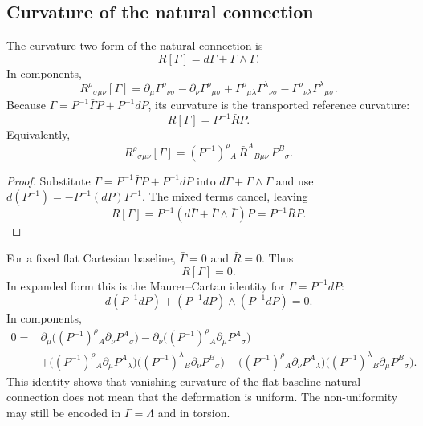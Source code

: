 \documentclass[12pt]{amsart}
\theoremstyle{definition}
\theoremstyle{remark}
\begin{document}
\subsection{Curvature of the natural connection}\label{subsec:curvature_natural_connection}

The curvature two-form of the natural connection is
\begin{equation}\label{eq:curvature_general_coefficients}
 R[\Gamma]=d\Gamma+\Gamma\wedge\Gamma.
\end{equation}
In components,
\begin{equation}\label{eq:curvature_components_gamma}
 R^\rho{}_{\sigma\mu\nu}[\Gamma]
 =\partial_\mu\Gamma^\rho{}_{\nu\sigma}
 -\partial_\nu\Gamma^\rho{}_{\mu\sigma}
 +\Gamma^\rho{}_{\mu\lambda}\Gamma^\lambda{}_{\nu\sigma}
 -\Gamma^\rho{}_{\nu\lambda}\Gamma^\lambda{}_{\mu\sigma}.
\end{equation}
Because \(\Gamma=P^{-1}\bar\Gamma P+P^{-1}dP\), its curvature is the transported reference curvature:
\begin{equation}\label{eq:natural_R_reference}
 R[\Gamma]=P^{-1}\bar R P.
\end{equation}
Equivalently,
\begin{equation}\label{eq:natural_R_reference_components}
 R^\rho{}_{\sigma\mu\nu}[\Gamma]
 =(P^{-1})^\rho{}_A\,\bar R^A{}_{B\mu\nu}\,P^B{}_{\sigma}.
\end{equation}

\begin{proof}
Substitute \(\Gamma=P^{-1}\bar\Gamma P+P^{-1}dP\) into \(d\Gamma+\Gamma\wedge\Gamma\) and use \(d(P^{-1})=-P^{-1}(dP)P^{-1}\).  The mixed terms cancel, leaving
\[
 R[\Gamma]=P^{-1}(d\bar\Gamma+\bar\Gamma\wedge\bar\Gamma)P=P^{-1}\bar R P.
\]
\end{proof}

For a fixed flat Cartesian baseline, \(\bar\Gamma=0\) and \(\bar R=0\).  Thus
\begin{equation}\label{eq:natural_R_flat_zero}
 R[\Gamma]=0.
\end{equation}
In expanded form this is the Maurer--Cartan identity for \(\Gamma=P^{-1}dP\):
\begin{equation}\label{eq:maurer_cartan_flat_connection}
 d(P^{-1}dP)+(P^{-1}dP)\wedge(P^{-1}dP)=0.
\end{equation}
In components,
\begin{align}\label{eq:maurer_cartan_components}
0={}&\partial_\mu\!\bigl((P^{-1})^\rho{}_A\partial_\nu P^A{}_{\sigma}\bigr)
-\partial_\nu\!\bigl((P^{-1})^\rho{}_A\partial_\mu P^A{}_{\sigma}\bigr)\nonumber\\
&+\bigl((P^{-1})^\rho{}_A\partial_\mu P^A{}_{\lambda}\bigr)
  \bigl((P^{-1})^\lambda{}_B\partial_\nu P^B{}_{\sigma}\bigr)
-\bigl((P^{-1})^\rho{}_A\partial_\nu P^A{}_{\lambda}\bigr)
  \bigl((P^{-1})^\lambda{}_B\partial_\mu P^B{}_{\sigma}\bigr).
\end{align}
This identity shows that vanishing curvature of the flat-baseline natural connection does not mean that the deformation is uniform.  The non-uniformity may still be encoded in \(\Gamma=\Lambda\) and in torsion.
\end{document}
